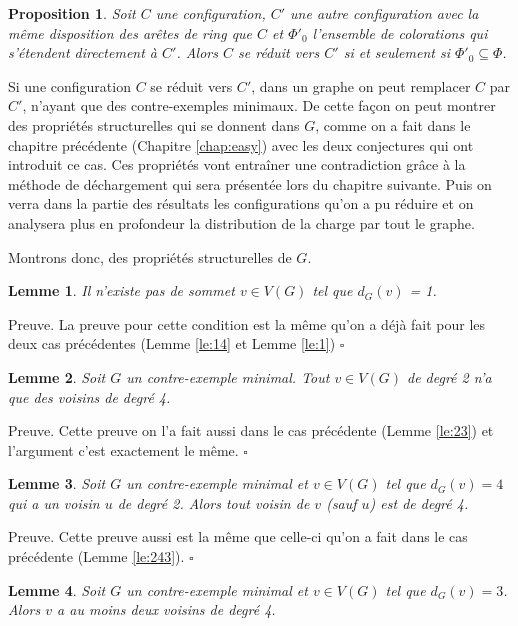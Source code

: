 \documentclass[10pt,a4paper]{article}
\newtheorem{proposition}{Proposition}
\newtheorem{lemme}{Lemme}
\newcommand{\ep}{{\hfill $\square$}}
\begin{document}
\begin{proposition}
Soit $C$ une configuration, $C'$ une autre configuration avec la même disposition des arêtes de ring que $C$ et $\Phi'_0$ l'ensemble de colorations qui s'étendent directement à $C'$. Alors $C$ se réduit vers $C'$ si et seulement si $\Phi'_0 \subseteq \Phi$.
\end{proposition}
\bigskip

Si une configuration $C$ se réduit vers $C'$, dans un graphe on peut remplacer $C$ par $C'$, n'ayant que des contre-exemples minimaux. De cette façon on peut montrer des propriétés structurelles qui se donnent dans $G$, comme on a fait dans le chapitre précédente (Chapitre \ref{chap:easy}) avec les deux conjectures qui ont introduit ce cas. Ces propriétés vont entraîner une contradiction grâce à la méthode de déchargement qui sera présentée lors du chapitre suivante. Puis on verra dans la partie des résultats les configurations qu'on a pu réduire et on analysera plus en profondeur la distribution de la charge par tout le graphe.

Montrons donc, des propriétés structurelles de $G$.

\begin{lemme}
Il n'existe pas de sommet $v \in V(G)$ tel que $d_G(v)$ = 1.
\end{lemme}

Preuve. 
La preuve pour cette condition est la même qu'on a déjà fait pour les deux cas précédentes (Lemme \ref{le:14} et Lemme \ref{le:1})
\ep

\begin{lemme}
Soit $G$ un contre-exemple minimal. Tout $v\in V(G)$ de degré 2 n'a que des voisins de degré 4.
\end{lemme}

Preuve. 
Cette preuve on l'a fait aussi dans le cas précédente (Lemme \ref{le:23}) et l'argument c'est exactement le même.
\ep 

\begin{lemme}
Soit $G$ un contre-exemple minimal et $v \in V(G)$ tel que $d_G(v)=4$ qui a un voisin $u$ de degré 2. Alors tout voisin de $v$ (sauf $u$) est de degré 4.
\end{lemme}

Preuve.
Cette preuve aussi est la même que celle-ci qu'on a fait dans le cas précédente (Lemme \ref{le:243}).
\ep

\begin{lemme}
Soit $G$ un contre-exemple minimal et $v \in V(G)$ tel que $d_G(v) = 3$. Alors $v$ a au moins deux voisins de degré 4.
\end{lemme}
\end{document}
